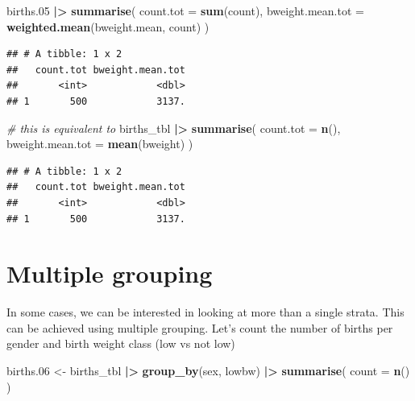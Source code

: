 \documentclass[
]{book}
\newenvironment{Shaded}{\begin{snugshade}}{\end{snugshade}}
\newcommand{\AttributeTok}[1]{\textcolor[rgb]{0.13,0.29,0.53}{#1}}
\newcommand{\CommentTok}[1]{\textcolor[rgb]{0.56,0.35,0.01}{\textit{#1}}}
\newcommand{\FloatTok}[1]{\textcolor[rgb]{0.00,0.00,0.81}{#1}}
\newcommand{\FunctionTok}[1]{\textcolor[rgb]{0.13,0.29,0.53}{\textbf{#1}}}
\newcommand{\NormalTok}[1]{#1}
\newcommand{\OtherTok}[1]{\textcolor[rgb]{0.56,0.35,0.01}{#1}}
\newcommand{\SpecialCharTok}[1]{\textcolor[rgb]{0.81,0.36,0.00}{\textbf{#1}}}
\theoremstyle{definition}
\theoremstyle{definition}
\theoremstyle{definition}
\theoremstyle{definition}
\theoremstyle{remark}
\begin{document}
\begin{Shaded}
\begin{Highlighting}[]
\NormalTok{births}\FloatTok{.05} \SpecialCharTok{|\textgreater{}}
  \FunctionTok{summarise}\NormalTok{(}
    \AttributeTok{count.tot =} \FunctionTok{sum}\NormalTok{(count),}
    \AttributeTok{bweight.mean.tot =} \FunctionTok{weighted.mean}\NormalTok{(bweight.mean, count)}
\NormalTok{  )}
\end{Highlighting}
\end{Shaded}

\begin{verbatim}
## # A tibble: 1 x 2
##   count.tot bweight.mean.tot
##       <int>            <dbl>
## 1       500            3137.
\end{verbatim}

\begin{Shaded}
\begin{Highlighting}[]
\CommentTok{\# this is equivalent to}
\NormalTok{births\_tbl }\SpecialCharTok{|\textgreater{}}
  \FunctionTok{summarise}\NormalTok{(}
    \AttributeTok{count.tot =} \FunctionTok{n}\NormalTok{(),}
    \AttributeTok{bweight.mean.tot =} \FunctionTok{mean}\NormalTok{(bweight)}
\NormalTok{  )}
\end{Highlighting}
\end{Shaded}

\begin{verbatim}
## # A tibble: 1 x 2
##   count.tot bweight.mean.tot
##       <int>            <dbl>
## 1       500            3137.
\end{verbatim}

\section{Multiple grouping}\label{multiple-grouping}

In some cases, we can be interested in looking at more than a single strata. This can be achieved using multiple grouping.
Let's count the number of births per gender and birth weight class (low vs not low)

\begin{Shaded}
\begin{Highlighting}[]
\NormalTok{births}\FloatTok{.06} \OtherTok{\textless{}{-}}
\NormalTok{  births\_tbl }\SpecialCharTok{|\textgreater{}}
  \FunctionTok{group\_by}\NormalTok{(sex, lowbw) }\SpecialCharTok{|\textgreater{}}
  \FunctionTok{summarise}\NormalTok{(}
    \AttributeTok{count =} \FunctionTok{n}\NormalTok{()}
\NormalTok{  )}
\end{Highlighting}
\end{Shaded}
\end{document}
